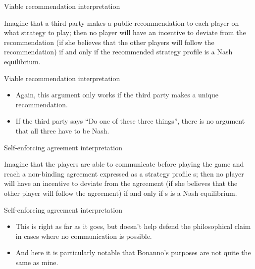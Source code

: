 \documentclass[
  14pt,
  letterpaper,
  ignorenonframetext,
  aspectratio=169,
  handout]{beamer}
\providecommand{\tightlist}{%
  \setlength{\itemsep}{0pt}\setlength{\parskip}{0pt}}\usepackage{longtable,booktabs,array}
\renewenvironment*{quote}	
	{\list{}{\rightmargin   \leftmargin} \item } 	
	{\endlist }
\let\olditem\item
\renewcommand{\item}{%
\olditem\vspace{6pt}}
\begin{document}
\begin{frame}{Viable recommendation interpretation}
\protect\hypertarget{viable-recommendation-interpretation}{}
\begin{quote}
Imagine that a third party makes a public recommendation to each player
on what strategy to play; then no player will have an incentive to
deviate from the recommendation (if she believes that the other players
will follow the recommendation) if and only if the recommended strategy
profile is a Nash equilibrium.
\end{quote}
\end{frame}

\begin{frame}{Viable recommendation interpretation}
\protect\hypertarget{viable-recommendation-interpretation-1}{}
\begin{itemize}[<+->]
\tightlist
\item
  Again, this argument only works if the third party makes a unique
  recommendation.
\item
  If the third party says ``Do one of these three things'', there is no
  argument that all three have to be Nash.
\end{itemize}
\end{frame}

\begin{frame}{Self-enforcing agreement interpretation}
\protect\hypertarget{self-enforcing-agreement-interpretation}{}
\begin{quote}
Imagine that the players are able to communicate before playing the game
and reach a non-binding agreement expressed as a strategy profile s;
then no player will have an incentive to deviate from the agreement (if
she believes that the other player will follow the agreement) if and
only if s is a Nash equilibrium.
\end{quote}
\end{frame}

\begin{frame}{Self-enforcing agreement interpretation}
\protect\hypertarget{self-enforcing-agreement-interpretation-1}{}
\begin{itemize}[<+->]
\tightlist
\item
  This is right as far as it goes, but doesn't help defend the
  philosophical claim in cases where no communication is possible.
\item
  And here it is particularly notable that Bonanno's purposes are not
  quite the same as mine.
\end{itemize}
\end{frame}
\end{document}
